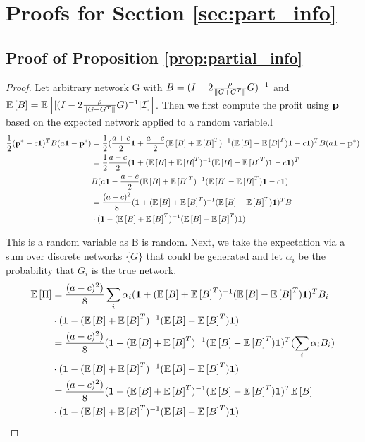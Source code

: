 \section{Proofs for Section \ref{sec:part_info}}

\subsection{Proof of Proposition \ref{prop:partial_info}} \label{proof:partial_info}
\begin{proof}
Let arbitrary network G with $B = (I - 2\rhof G)^{-1}  $  and $\ev{B} = \ev{ [ (I - 2\rhof G)^{-1} | \mathcal{I} ]}$. Then we first compute the profit using $\tb{p}$ based on the expected network applied to a random variable.l 
\begin{align*}
    \frac{1}{2} (\bp^* - c\bo)^T B (a\bo - \bp^*) &= \frac{1}{2}(\frac{a+c}{2} \bo + \frac{a-c}{2} ({\ev{B}} + {\ev{B}}^T)^{-1} ({\ev{B}} - {\ev{B}}^T)\bo - c\bo)^T B (a\bo - \bp^*)\\
    &= \frac{1}{2}\frac{a-c}{2} (\bo +  ({\ev{B}} + {\ev{B}}^T)^{-1} ({\ev{B}} - {\ev{B}}^T)\bo - c\bo)^T\\
    & B (a\bo - \frac{a-c}{2}  ({\ev{B}} + {\ev{B}}^T)^{-1} ({\ev{B}} - {\ev{B}}^T)\bo - c\bo)\\
    &= \frac{(a-c)^2}{8}(\bo + ({\ev{B}} + {\ev{B}}^T)^{-1} ({\ev{B}} - {\ev{B}}^T)\bo)^T B\\&\cdot (\bo - ({\ev{B}} + {\ev{B}}^T)^{-1} ({\ev{B}}- {\ev{B}}^T)\bo)
\end{align*}

This is a random variable as B is random. Next, we take the expectation via a sum over discrete networks $\{G\}$ that could be generated and let $\alpha_i$ be the probability that $G_i$ is the true network. 
\begin{align*}
    \ex{ \Pi } &= \frac{(a-c)^2)}{8} \sum_{i} \alpha_i (\bo + ({\ev{B}} + {\ev{B}}^T)^{-1} ({\ev{B}} - {\ev{B}}^T)\bo)^T B_i\\&\cdot (\bo - ({\ev{B}} + \ev{B}^T)^{-1} (\ev{B}- {\ev{B}}^T)\bo) \\
    &= \frac{(a-c)^2)}{8} (\bo + ({\ev{B}} + {\ev{B}}^T)^{-1} ({\ev{B}} - {\ev{B}}^T)\bo)^T (\sum_{i} \alpha_i  B_i)\\&\cdot (\bo - ({\ev{B}} + \ev{B}^T)^{-1} (\ev{B}- {\ev{B}}^T)\bo) \\
    &= \frac{(a-c)^2)}{8} (\bo + ({\ev{B}} + {\ev{B}}^T)^{-1} ({\ev{B}} - {\ev{B}}^T)\bo)^T {\ev{B}} \\&\cdot (\bo - ({\ev{B}} + {\ev{B}}^T)^{-1} ({\ev{B}}- {\ev{B}}^T)\bo) 
\end{align*} 

\end{proof} 


